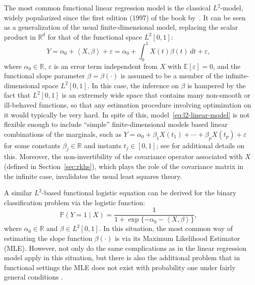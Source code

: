 \documentclass[ba]{imsart}
\numberwithin{equation}{section}
\theoremstyle{plain}
\renewcommand{\epsilon}{\varepsilon}
\newcommand{\R}{\mathbb{R}}
\newcommand{\E}{\mathbb{E}}
\newcommand\dotprod[2]{\left\langle #1, #2 \right\rangle}
\begin{document}
 The most common functional linear regression model is the classical \(L^2\)-model, widely popularized since the first edition (1997) of the book by~\citet{ramsay2005functional}. It can be seen as a generalization of the usual finite-dimensional model, replacing the scalar product in \(\R^d\) for that of the functional space \(L^2[0,1]\):
\begin{equation}\label{eq:l2-linear-model}
Y = \alpha_0 + \dotprod{X}{\beta} + \epsilon = \alpha_0 + \int_0^1 X(t)\beta(t)\, dt + \epsilon,
\end{equation}
where \(\alpha_0\in \R\), \(\epsilon\) is an error term independent from \(X\) with \(\E [\epsilon]=0\), and the functional slope parameter \(\beta=\beta(\cdot)\) is assumed to be a member of the infinite-dimensional space \(L^2[0, 1]\). In this case, the inference on \(\beta\) is hampered by the fact that \(L^2[0,1]\) is an extremely wide space that contains many non-smooth or ill-behaved functions, so that any estimation procedure involving optimization on it would typically be very hard. In spite of this, model~\eqref{eq:l2-linear-model} is not flexible enough to include ``simple'' finite-dimensional models based linear combinations of the marginals, such as \(Y=\alpha_0 + \beta_1 X(t_1)+ \cdots + \beta_p X(t_p) + \epsilon\) for some constants \(\beta_j\in\R\) and instants \(t_j\in[0,1]\); see \citet{berrendero2020general} for additional details on this. Moreover, the non-invertibility of the covariance operator associated with \(X\) (defined in Section~\ref{sec:rkhs}), which plays the role of the covariance matrix in the infinite case, invalidates the usual least squares theory.

A similar \(L^2\)-based functional logistic equation can be derived for the binary classification problem via the logistic function:
\begin{equation}\label{eq:l2-logistic-model}
  \mathbb P(Y=1 \mid X) = \frac{1}{1 + \exp\{-\alpha_0 - \dotprod{X}{\beta}\}},
\end{equation}
where \(\alpha_0 \in \R\) and \(\beta \in L^2[0, 1]\). In this situation, the most common way of estimating the slope function \(\beta(\cdot)\) is via its Maximum Likelihood Estimator (MLE). However, not only do the same complications as in the linear regression model apply in this situation, but there is also the additional problem that in functional settings the MLE does not exist with probability one under fairly general conditions \citep[see][Sec.~3.2]{berrendero2021functional}.
\end{document}
